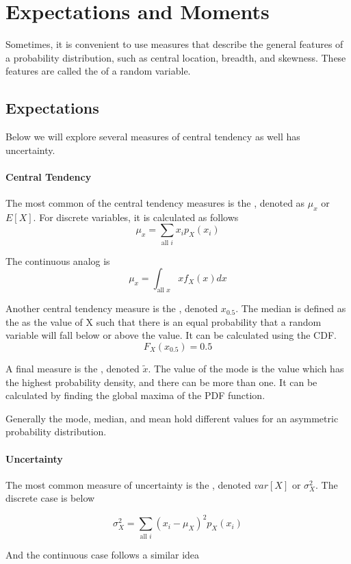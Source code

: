 \chapter {Expectations and Moments}
Sometimes, it is convenient to use measures that describe the general features of a probability distribution, such as central location, breadth, and skewness. These features are called the  of a random variable.

\section{Expectations}
Below we will explore several measures of central tendency as well has uncertainty.

\subsubsection*{Central Tendency}
The most common of the central tendency measures is the , denoted as $\mu_x$ or $E[X]$. For discrete variables, it is calculated as follows
\[
    \mu_x = \sum_{\text{all } i} x_i p_X(x_i) 
\]

The continuous analog is 
\[
    \mu_x = \int_{\text{all } x} xf_X(x)dx
\]

Another central tendency measure is the , denoted $x_{0.5}$. The median is defined as the as the value of X such that there is an equal probability that a random variable will fall below or above the value. It can be calculated using the CDF.
\[
    F_X(x_{0.5}) = 0.5
\]

A final measure is the , denoted $\tilde{x}$. The value of the mode is the value which has the highest probability density, and there can be more than one. It can be calculated by finding the global maxima of the PDF function.

Generally the mode, median, and mean hold different values for an asymmetric probability distribution. 

\subsubsection*{Uncertainty}
The most common measure of uncertainty is the , denoted $var[X]$ or $\sigma_X^2$. The discrete case is below

\[
    \sigma_X^2 = \sum_{\text{all }i}(x_i - \mu_X)^2p_X(x_i)  
\]

And the continuous case follows a similar idea

